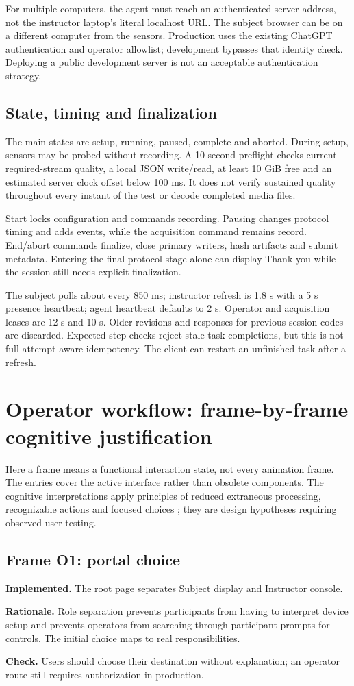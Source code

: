 \documentclass[11pt,a4paper]{article}
\begin{document}
For multiple computers, the agent must reach an authenticated server address, not the instructor laptop's literal localhost URL. The subject browser can be on a different computer from the sensors. Production uses the existing ChatGPT authentication and operator allowlist; development bypasses that identity check. Deploying a public development server is not an acceptable authentication strategy.

\subsection{State, timing and finalization}
The main states are setup, running, paused, complete and aborted. During setup, sensors may be probed without recording. A 10-second preflight checks current required-stream quality, a local JSON write/read, at least 10 GiB free and an estimated server clock offset below 100 ms. It does not verify sustained quality throughout every instant of the test or decode completed media files.

Start locks configuration and commands recording. Pausing changes protocol timing and adds events, while the acquisition command remains record. End/abort commands finalize, close primary writers, hash artifacts and submit metadata. Entering the final protocol stage alone can display Thank you while the session still needs explicit finalization.

The subject polls about every 850 ms; instructor refresh is 1.8 s with a 5 s presence heartbeat; agent heartbeat defaults to 2 s. Operator and acquisition leases are 12 s and 10 s. Older revisions and responses for previous session codes are discarded. Expected-step checks reject stale task completions, but this is not full attempt-aware idempotency. The client can restart an unfinished task after a refresh.

\clearpage
\section{Operator workflow: frame-by-frame cognitive justification}
Here a frame means a functional interaction state, not every animation frame. The entries cover the active interface rather than obsolete components. The cognitive interpretations apply principles of reduced extraneous processing, recognizable actions and focused choices \cite{sweller,hick}; they are design hypotheses requiring observed user testing.

\subsection{Frame O1: portal choice}
\textbf{Implemented.} The root page separates Subject display and Instructor console.\par
\textbf{Rationale.} Role separation prevents participants from having to interpret device setup and prevents operators from searching through participant prompts for controls. The initial choice maps to real responsibilities.\par
\textbf{Check.} Users should choose their destination without explanation; an operator route still requires authorization in production.
\end{document}
